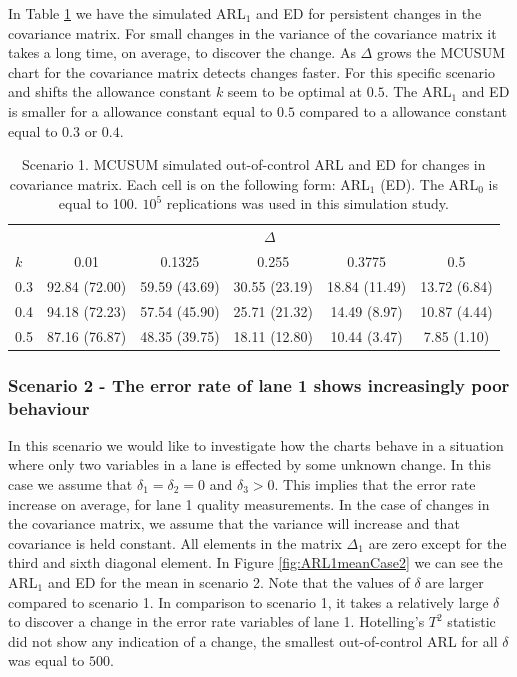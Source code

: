\documentclass[a4paper,11pt,fleqn,twoside,notitlepage]{report}\usepackage[]{graphicx}\usepackage[]{color}
\begin{document}
In Table \ref{LongTable1} we have the simulated ARL$_1$ and ED for persistent changes in the covariance matrix. For small changes in the variance of the covariance matrix it takes a long time, on average, to discover the change. As $\Delta$ grows the MCUSUM chart for the covariance matrix detects changes faster. For this specific scenario and shifts the allowance constant $k$ seem to be optimal at $0.5$. The ARL$_1$ and ED is smaller for a allowance constant equal to $0.5$ compared to a allowance constant equal to $0.3$ or $0.4$.
\begin{table}[ht]
\centering
\caption{Scenario 1. MCUSUM simulated out-of-control ARL and ED for changes in covariance matrix. Each cell is on the following form: ARL$_1$ (ED). The ARL$_0$ is equal to 100. $10^5$ replications was used in this simulation study.\label{LongTable1}}
\begin{tabular}{lccccc}
\toprule
& \multicolumn{5}{c}{$\Delta$} \\ \cmidrule(r){2-6}
$k$ & 0.01 & 0.1325 & 0.255 & 0.3775 & 0.5 \\[0.1cm]
\midrule
 0.3 & 92.84 (72.00) & 59.59 (43.69) & 30.55 (23.19) & 18.84 (11.49) & 13.72 (6.84) \\[0.1cm]
\midrule
  0.4 & 94.18 (72.23) &  57.54 (45.90) & 25.71 (21.32) & 14.49 (8.97) & 10.87 (4.44) \\[0.1cm]
\midrule
  0.5 & 87.16 (76.87) & 48.35 (39.75) & 18.11 (12.80) & 10.44 (3.47) & 7.85 (1.10) \\[0.1cm] 
\bottomrule
\end{tabular}
\end{table}

\subsubsection{Scenario 2 - The error rate of lane 1 shows increasingly poor behaviour}

In this scenario we would like to investigate how the charts behave in a situation where only two variables in a lane is effected by some unknown change. In this case we assume that $\delta_1=\delta_2=0$ and $\delta_3>0$. This implies that the error rate increase on average, for lane 1 quality measurements. In the case of changes in the covariance matrix, we assume that the variance will increase and that covariance is held constant. All elements in the matrix $\Delta_1$ are zero except for the third and sixth diagonal element. In Figure \ref{fig:ARL1meanCase2} we can see the ARL$_1$ and ED for the mean in scenario 2. Note that the values of $\delta$ are larger compared to scenario 1. In comparison to scenario 1, it takes a relatively large $\delta$ to discover a change in the error rate variables of lane 1. Hotelling's $T^2$ statistic did not show any indication of a change, the smallest out-of-control ARL for all $\delta$ was equal to $500$.
\end{document}
